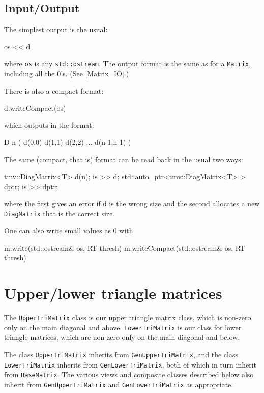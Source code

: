 \documentclass[twoside,letterpaper,11pt]{article}
\renewcommand{\tt}[1]{{\lstinline {#1}}}
\begin{document}
\subsection{Input/Output}
\label{DiagMatrix_IO}

The simplest output is the usual:
\begin{tmvcode}
os << d
\end{tmvcode}
where \tt{os} is any \tt{std::ostream}.
The output format is the same as for a \tt{Matrix}, including all the 0's.
(See \ref{Matrix_IO}.)


There is also a compact format:
\begin{tmvcode}
d.writeCompact(os)
\end{tmvcode}
which outputs in the format:
\begin{tmvcode}
D n ( d(0,0)  d(1,1)  d(2,2)  ...  d(n-1,n-1) )
\end{tmvcode}

The same (compact, that is) format can be read back in the usual two ways:
\begin{tmvcode}
tmv::DiagMatrix<T> d(n);
is >> d;
std::auto_ptr<tmv::DiagMatrix<T> > dptr;
is >> dptr;
\end{tmvcode}
where the first gives an error if \tt{d} is the wrong size and the second allocates
a new \tt{DiagMatrix} that is the correct size.

One can also write small values as 0 with
\begin{tmvcode}
m.write(std::ostream& os, RT thresh)
m.writeCompact(std::ostream& os, RT thresh)
\end{tmvcode}

\newpage
\section{Upper/lower triangle matrices}
\label{TriMatrix}

The \tt{UpperTriMatrix} class is our upper triangle matrix class, which is non-zero
only on the main diagonal and above.  \tt{LowerTriMatrix} is our class for lower
triangle matrices, which are non-zero only on the main diagonal and below.

The class \tt{UpperTriMatrix} inherits from \tt{GenUpperTriMatrix}, 
and the class \tt{LowerTriMatrix}
inherits from \tt{GenLowerTriMatrix}, both of
which in turn inherit from \tt{BaseMatrix}.  
The various views and composite classes described below
also inherit from \tt{GenUpperTriMatrix} and \tt{GenLowerTriMatrix} 
as appropriate.
\end{document}

